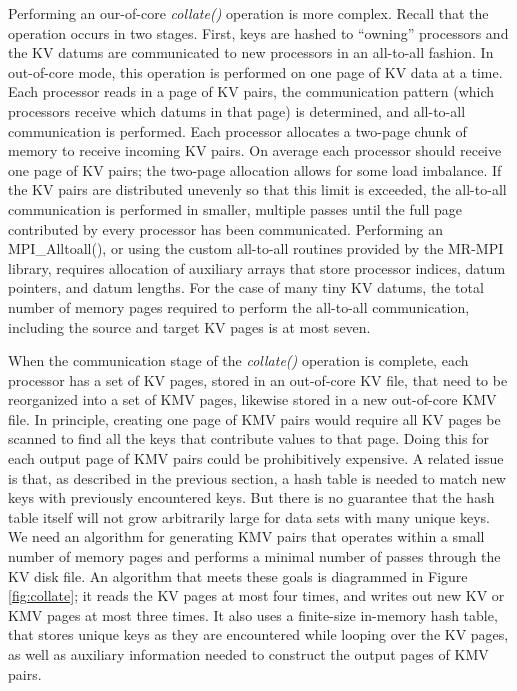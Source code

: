 Performing an our-of-core {\it collate()} operation is more complex.
Recall that the operation occurs in two stages.  First, keys are
hashed to ``owning'' processors and the KV datums are communicated to
new processors in an all-to-all fashion.  In out-of-core mode, this
operation is performed on one page of KV data at a time.  Each
processor reads in a page of KV pairs, the communication pattern
(which processors receive which datums in that page) is determined,
and all-to-all communication is performed.  Each processor allocates a
two-page chunk of memory to receive incoming KV pairs.  On average
each processor should receive one page of KV pairs; the two-page
allocation allows for some load imbalance.  If the KV pairs are
distributed unevenly so that this limit is exceeded, the all-to-all
communication is performed in smaller, multiple passes until the full
page contributed by every processor has been communicated.  Performing
an MPI\_Alltoall(), or using the custom all-to-all routines provided
by the MR-MPI library, requires allocation of auxiliary arrays that
store processor indices, datum pointers, and datum lengths.  For the
case of many tiny KV datums, the total number of memory pages required
to perform the all-to-all communication, including the source and
target KV pages is at most seven.

When the communication stage of the {\it collate()} operation is
complete, each processor has a set of KV pages, stored in an
out-of-core KV file, that need to be reorganized into a set of KMV
pages, likewise stored in a new out-of-core KMV file.  In principle,
creating one page of KMV pairs would require all KV pages be scanned
to find all the keys that contribute values to that page.  Doing this
for each output page of KMV pairs could be prohibitively expensive.  A
related issue is that, as described in the previous section, a hash
table is needed to match new keys with previously encountered keys.
But there is no guarantee that the hash table itself will not grow
arbitrarily large for data sets with many unique keys.  We need an
algorithm for generating KMV pairs that operates within a small number
of memory pages and performs a minimal number of passes through the KV
disk file.  An algorithm that meets these goals is diagrammed in
Figure \ref{fig:collate}; it reads the KV pages at most four times,
and writes out new KV or KMV pages at most three times.  It also uses
a finite-size in-memory hash table, that stores unique keys as they
are encountered while looping over the KV pages, as well as auxiliary
information needed to construct the output pages of KMV pairs.

